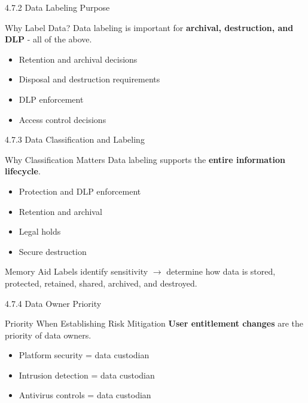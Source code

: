 \documentclass{beamer}
\begin{document}
	\begin{frame}{4.7.2 Data Labeling Purpose}
		\begin{block}{Why Label Data?}
			Data labeling is important for \textbf{archival, destruction, and DLP} - all of the above.
		\end{block}
		\begin{itemize}
			\item Retention and archival decisions
			\item Disposal and destruction requirements
			\item DLP enforcement
			\item Access control decisions
		\end{itemize}
	\end{frame}
	
	\begin{frame}{4.7.3 Data Classification and Labeling}
		\begin{block}{Why Classification Matters}
			Data labeling supports the \textbf{entire information lifecycle}.
		\end{block}
		\begin{itemize}
			\item Protection and DLP enforcement
			\item Retention and archival
			\item Legal holds
			\item Secure destruction
		\end{itemize}
		\begin{exampleblock}{Memory Aid}
			Labels identify sensitivity $\rightarrow$ determine how data is stored, protected, retained, shared, archived, and destroyed.
		\end{exampleblock}
	\end{frame}
	
	\begin{frame}{4.7.4 Data Owner Priority}
		\begin{block}{Priority When Establishing Risk Mitigation}
			\textbf{User entitlement changes} are the priority of data owners.
		\end{block}
		\begin{itemize}
			\item Platform security = data custodian
			\item Intrusion detection = data custodian
			\item Antivirus controls = data custodian
		\end{itemize}
	\end{frame}
	
\end{document}
